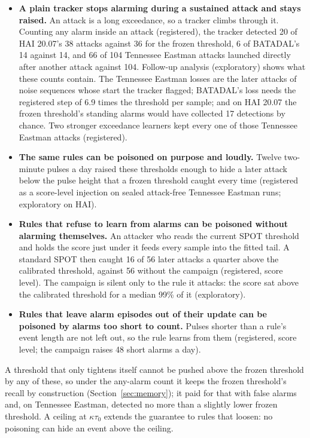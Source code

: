 \documentclass[letterpaper,twocolumn,10pt]{article}
\begin{document}
\begin{itemize}
\item \textbf{A plain tracker stops alarming during a sustained attack and stays raised.} An attack is
  a long exceedance, so a tracker climbs through it. Counting any alarm inside an attack (registered),
  the tracker detected 20 of HAI 20.07's 38 attacks against 36 for the frozen threshold, 6 of BATADAL's
  14 against 14, and 66 of 104 Tennessee Eastman attacks launched directly after another attack against
  104. Follow-up analysis (exploratory) shows what these counts contain. The Tennessee Eastman losses
  are the later attacks of noise sequences whose start the tracker flagged; BATADAL's loss needs the
  registered step of 6.9 times the threshold per sample; and on HAI 20.07 the frozen threshold's
  standing alarms would have collected 17 detections by chance. Two stronger exceedance learners kept
  every one of those Tennessee Eastman attacks (registered).
\item \textbf{The same rules can be poisoned on purpose and loudly.} Twelve two-minute pulses a
  day raised these thresholds enough to hide a later attack below the pulse height that a frozen
  threshold caught every time (registered as a score-level injection on sealed attack-free Tennessee
  Eastman runs; exploratory on HAI).
\item \textbf{Rules that refuse to learn from alarms can be poisoned without alarming themselves.} An
  attacker who reads the current SPOT threshold and holds the score just under it feeds every sample
  into the fitted tail. A standard SPOT then caught 16 of 56 later attacks a quarter above the
  calibrated threshold, against 56 without the campaign (registered, score level). The campaign is
  silent only to the rule it attacks: the score sat above the calibrated threshold for a median 99\%
  of it (exploratory).
\item \textbf{Rules that leave alarm episodes out of their update can be poisoned by alarms too short
  to count.} Pulses shorter than a rule's event length are not left out, so the rule learns from them
  (registered, score level; the campaign raises 48 short alarms a day).
\end{itemize}

A threshold that only tightens itself cannot be pushed above the frozen threshold by any of these, so
under the any-alarm count it keeps the frozen threshold's recall by construction
(Section~\ref{sec:memory}); it paid for that with false alarms and, on Tennessee Eastman, detected no
more than a slightly lower frozen threshold. A ceiling at $\kappa\tau_0$ extends the guarantee to rules
that loosen: no poisoning can hide an event above the ceiling.
\end{document}
